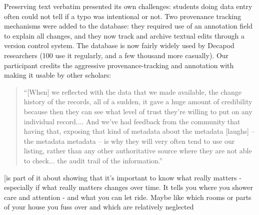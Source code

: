 Preserving text verbatim presented its own challenges: students doing data entry often could not tell if a typo was intentional or not. Two provenance tracking mechanisms were added to the database: they required use of an annotation field to explain all changes, and they now track and archive textual edits through a version control system. The database is now fairly widely used by Decapod researchers (100 use it regularly, and a few thousand more casually). Our participant credits the aggressive provenance-tracking and annotation with making it usable by other scholars:
\begin{quote}
“[When] we reflected with the data that we made available, the change history of the records, all of a sudden, it gave a huge amount of credibility because then they can see what level of trust they're willing to put on any individual record.... And we've had feedback from the community that having that, exposing that kind of metadata about the metadata [laughs] – the metadata metadata – is why they will very often tend to use our listing, rather than any other authoritative source where they are not able to check... the audit trail of the information.”
\end{quote}

[is part of it about showing that it's important to know what really matters - especially if what really matters changes over time. It tells you where you shower care and attention - and what you can let ride. Maybe like which rooms or parts of your house you fuss over and which are relatively neglected